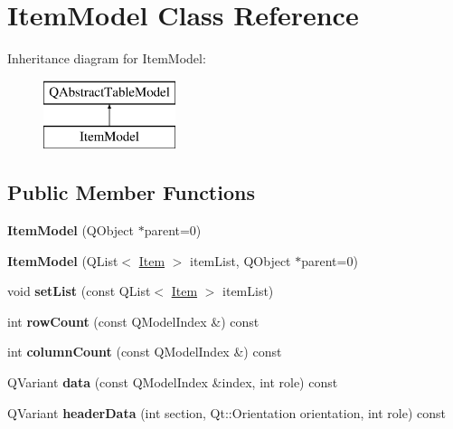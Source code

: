 \hypertarget{class_item_model}{}\section{Item\+Model Class Reference}
\label{class_item_model}
Inheritance diagram for Item\+Model\+:\begin{figure}[H]
\begin{center}
\leavevmode
\includegraphics[height=2.000000cm]{class_item_model}
\end{center}
\end{figure}
\subsection*{Public Member Functions}
\begin{DoxyCompactItemize}
\item 
\mbox{\label{class_item_model_a8f3f4becd549700202fad2c59aa3069d}} 
{\bfseries Item\+Model} (Q\+Object $\ast$parent=0)
\item 
\mbox{\label{class_item_model_ac7f87167bc2f0d34ab48a04807b4a3d5}} 
{\bfseries Item\+Model} (Q\+List$<$ \mbox{\hyperlink{class_item}{Item}} $>$ item\+List, Q\+Object $\ast$parent=0)
\item 
\mbox{\label{class_item_model_a22a570830b9434396f128a27d0aafa02}} 
void {\bfseries set\+List} (const Q\+List$<$ \mbox{\hyperlink{class_item}{Item}} $>$ item\+List)
\item 
\mbox{\label{class_item_model_ab71e5ac3f9fc6d368ffb11321315602e}} 
int {\bfseries row\+Count} (const Q\+Model\+Index \&) const
\item 
\mbox{\label{class_item_model_a75bc0e3bcfa14e55ed14f197f1dc710b}} 
int {\bfseries column\+Count} (const Q\+Model\+Index \&) const
\item 
\mbox{\label{class_item_model_a434533c6c4a038db2a4d04bbef51a9dd}} 
Q\+Variant {\bfseries data} (const Q\+Model\+Index \&index, int role) const
\item 
\mbox{\label{class_item_model_ae9df59dfb1f992e7ab244fa8c6240a72}} 
Q\+Variant {\bfseries header\+Data} (int section, Qt\+::\+Orientation orientation, int role) const
\end{DoxyCompactItemize}
